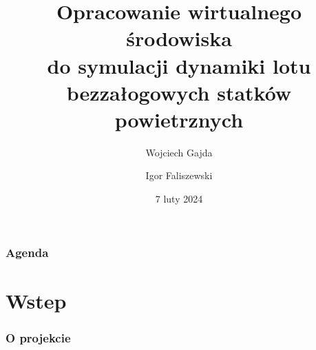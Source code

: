 \documentclass[aspectratio=169]{beamer}
\title{Opracowanie wirtualnego środowiska\\do symulacji dynamiki lotu\\ bezzałogowych statków powietrznych}
\author{Wojciech Gajda \and  Igor Faliszewski}
\date{7 luty 2024} %
\begin{document}
\sloppy

{
\maketitleframe 
}

\begin{frame}
\frametitle{Agenda}
  \tableofcontents[  
    sectionstyle=show, 
    ]
\end{frame}


\section{Wstep}

\begin{frame}%
	\frametitle{O projekcie}
	\begin{columns}
		\begin{column}{0.33\textwidth}
	   	 	\begin{figure}
	   		 \centering
	    		\end{figure}
		\end{column}
		\begin{column}{0.33\textwidth}
	   	 	\begin{figure}
	   		 \centering

\end{figure}
\end{column}
\end{columns}
\end{frame}
\end{document}
